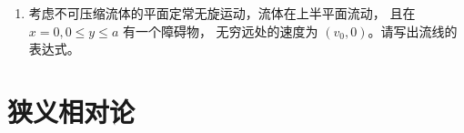 \begin{enumerate}
    解：作定常无旋流动的理想不可压缩流体，遵循无旋性、质量方程与动量方程：
    \begin{align*}
        &\nabla\cdot\v=0,\text{ 即 }\frac{\partial{v_i}}{\partial{x_j}}=\frac{\partial{v_j}}{\partial{x_i}}\\
        &(\v\cdot\nabla)\v+\frac{1}{\rho}\nabla p+\nabla U=0\\
        &\nabla\times\v=0
    \end{align*}
    故
    \begin{align*}
        \nabla\left(\frac12\|\v\|^2+U+\frac{p}{\rho}\right)&=\frac{\partial\big(\frac12 v_iv_i\big)}{\partial x_j}+\nabla U+\frac{1}{\rho}p\\
        &=v_i\frac{\partial{v_i}}{\partial{x_j}}+\nabla U+\frac{1}{\rho}p\\
        &=v_i\frac{\partial{v_j}}{\partial{x_i}}-(\v\cdot\nabla)\v\\
        &=0,
    \end{align*}
    从而全空间上$\dfrac12\|\v\|^2+U+\dfrac{p}{\rho}$为常数.
    
    \item 考虑不可压缩流体的平面定常无旋运动，流体在上半平面流动，
    且在 $x=0,0 \leqslant y \leqslant a$ 有一个障碍物，
    无穷远处的速度为 $(v_0, 0)$。请写出流线的表达式。
\end{enumerate}


\section{狭义相对论}




